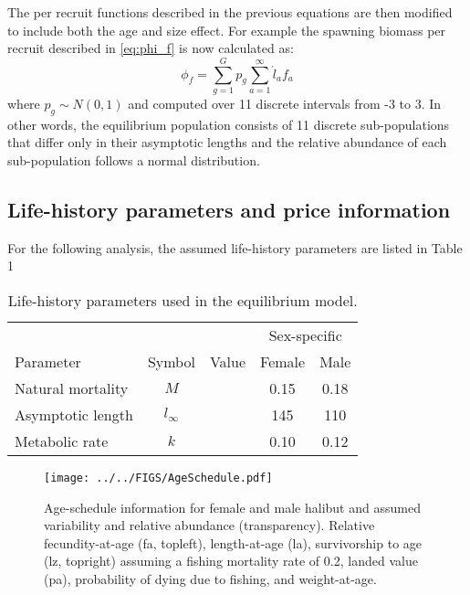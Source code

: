 The per recruit functions described in the previous equations are then modified to include both the age and size effect.  For example the spawning biomass per recruit described in \eqref{eq:phi_f} is now calculated as:
\begin{equation}
	\phi_{f} =\sum_{g=1}^G p_g \sum_{a=1}^\infty \acute{l}_a f_a\label{eq:phi_fg}
\end{equation}
where $p_g \sim N(0,1)$ and computed over 11 discrete intervals from -3 to 3.  In other words, the equilibrium population consists of 11 discrete sub-populations that differ only in their asymptotic lengths and the relative abundance of each sub-population follows a normal distribution.

\subsection*{Life-history parameters and price information} %
\label{sub:life_history_parameters_and_price_information}
For the following analysis, the assumed life-history parameters are listed in Table 1

\begin{table}
	\caption{Life-history parameters used in the equilibrium model.}
	\label{table:Life_history_pars}
	\begin{center}
	\begin{tabular}{lcccc}
		\hline
		 &  & & \multicolumn{2}{c}{Sex-specific}\\
		Parameter         & Symbol     & Value & Female & Male \\
		\hline
		Natural mortality & $M$        &       &   0.15 & 0.18 \\
		Asymptotic length & $l_\infty$ &       &   145  & 110  \\
		Metabolic rate    & $k$        &       &   0.10 & 0.12 \\
		\hline
		
	\end{tabular}
	\end{center}
\end{table}


\begin{figure}[htbp]
	\centering
		\texttt{[image: ../../FIGS/AgeSchedule.pdf]}
	\caption{Age-schedule information for female and male halibut and assumed variability and relative abundance (transparency). Relative fecundity-at-age (fa, topleft), length-at-age (la), survivorship to age (lz, topright) assuming a fishing mortality rate of 0.2, landed value (pa), probability of dying due to fishing, and weight-at-age.}
	\label{fig:FIGS_AgeSchedule}
\end{figure}



